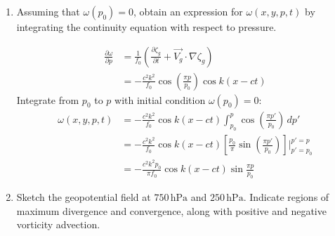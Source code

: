 \documentclass[11pt,a4paper]{article}
\begin{document}
{\begin{enumerate}[label=(\alph*)]
    
    \item Assuming that $\omega(p_0) = 0$, obtain an expression for $\omega(x,y,p,t)$ by integrating the continuity equation with respect to pressure.
\begin{solution}
    \begin{align*}
        \frac{\partial \omega}{\partial p}
        &= \frac{1}{f_0} \left(\frac{\partial \zeta_g}{\partial t} + \vec{V_g}\cdot \nabla \zeta_g\right)\\
        &= -\frac{c^2 k^2}{f_0} \cos \left(\frac{\pi p }{p_0}\right) \cos k (x-ct)
    \end{align*}
    Integrate from $p_0$ to $p$ with initial condition $\omega(p_0)=0:$
    \begin{align*}
        \omega(x,y,p,t)
        &=  -\frac{c^2 k^2}{f_0} \cos k (x-ct) \int_{p_0}^p \cos \left(\frac{\pi p' }{p_0}\right) \, dp'\\
        &=  -\frac{c^2 k^2}{f_0} \cos k (x-ct) \left[\frac{p_0}{\pi}\sin\left(\frac{\pi p'}{p_0}\right) \right] \bigg|_{p'=p_0}^{p'=p}\\
        &=-\frac{c^2 k^2 p_0}{\pi f_0} \cos k (x-ct) \sin \frac{\pi p}{p_0}
    \end{align*}
\end{solution}
    
    \item Sketch the geopotential field at $750\,\mathrm{hPa}$ and $250\,\mathrm{hPa}$. Indicate regions of maximum divergence and convergence, along with positive and negative vorticity advection.


\end{enumerate}}
\end{document}
